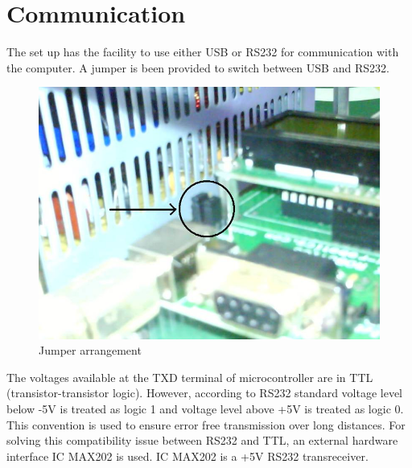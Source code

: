 \documentclass[12pt]{report}
\begin{document}
\section{Communication}
The set up has the facility to use either USB or RS232 for communication with the computer. A jumper is been provided to switch between USB and RS232.
\begin{figure}
\centering
\includegraphics[width=0.5\linewidth]{c.jpg}
\caption{Jumper arrangement}
\end{figure}
The voltages available at the TXD terminal of microcontroller are in TTL (transistor-transistor logic). However, according to RS232 standard voltage level below -5V is treated as logic 1 and voltage level above +5V is treated as logic 0. This convention is used to ensure error free transmission over long distances. For solving this compatibility issue between RS232 and TTL, an external hardware interface IC MAX202 is used. IC MAX202 is a +5V RS232 transreceiver.
\end{document}
